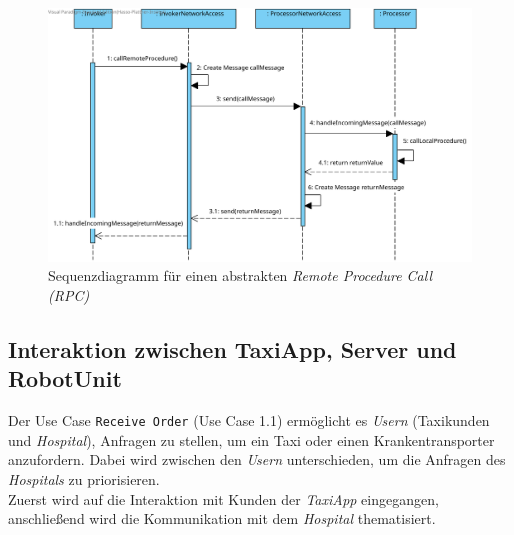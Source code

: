 \begin{figure}[H]
	\centering
	\includegraphics[height=0.85\textwidth, angle=90]{img/2-Entwurf-Communication_RPC}
	\caption{Sequenzdiagramm für einen abstrakten \emph{Remote Procedure Call (RPC)}}
	\label{SequenzDiagrammRPC}
\end{figure}

\subsection*{Interaktion zwischen TaxiApp, Server und RobotUnit}

Der Use Case \texttt{Receive Order} (Use Case 1.1) ermöglicht es \emph{Usern} (Taxikunden und \emph{Hospital}), Anfragen zu stellen, um ein Taxi oder einen Krankentransporter anzufordern. Dabei wird zwischen den \emph{Usern} unterschieden, um die Anfragen des \emph{Hospitals} zu priorisieren.\\
Zuerst wird auf die Interaktion mit Kunden der \emph{TaxiApp} eingegangen, anschließend wird die Kommunikation mit dem \emph{Hospital} thematisiert. \\ \\

